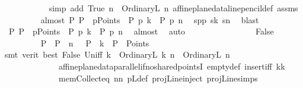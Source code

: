 \begin{isabellebody}
\ \ \ \ \ \ \ \ \ \ \isamarkupfalse%
\ {\isacharparenleft}{\kern0pt}simp\ add{\isacharcolon}{\kern0pt}\ True\ {\isacartoucheopen}n\ {\isacharequal}{\kern0pt}\ OrdinaryL\ n{}{\isacartoucheclose}\ affine{\isacharunderscore}{\kern0pt}plane{\isacharunderscore}{\kern0pt}data{\isachardot}{\kern0pt}line{\isacharunderscore}{\kern0pt}pencil{\isacharunderscore}{\kern0pt}def\ assms{\isacharparenleft}{\kern0pt}{}{\isacharparenright}{\kern0pt}{\isacharparenright}{\kern0pt}\isanewline
\ \ \ \ \ \ \ \ \isamarkupfalse%
\ almost{\isacharcolon}{\kern0pt}\ {\isachardoublequoteopen}{\isasymexists}P{\isachardot}{\kern0pt}\ P\ {\isasymin}\ pPoints\ {\isasymand}\ P\ p{\isasymlhd}\ k\ {\isasymand}\ P\ p{\isasymlhd}\ n{\isachardoublequoteclose}\ \isamarkupfalse%
\ spp\ sk\ sn\ \isamarkupfalse%
\ blast\isanewline
\ \ \ \ \ \ \ \ \isamarkupfalse%
\ \ {\isachardoublequoteopen}{\isasymexists}P{\isachardot}{\kern0pt}\ P\ {\isasymin}\ pPoints\ {\isasymand}\ P\ p{\isasymlhd}\ k\ {\isasymand}\ P\ p{\isasymlhd}\ n{\isachardoublequoteclose}\ \isamarkupfalse%
\ almost\ \isamarkupfalse%
\ auto\isanewline
\ \ \ \ \ \ \isamarkupfalse%
\isanewline
\ \ \ \ \ \ \ \ \isamarkupfalse%
\ False\ \isanewline
\ \ \ \ \ \ \ \ \isamarkupfalse%
\ P\ \ {\isachardoublequoteopen}P\ {\isasymlhd}\ n{}\ \ {\isasymand}\ P\ {\isasymlhd}\ k{}\ {\isasymand}\ P\ {\isasymin}\ Points{\isachardoublequoteclose}\ \isanewline
\ \ \ \ \ \ \ \ \ \ \isamarkupfalse%
\ {\isacharparenleft}{\kern0pt}smt\ {\isacharparenleft}{\kern0pt}verit{\isacharcomma}{\kern0pt}\ best{\isacharparenright}{\kern0pt}\ False\ Un{\isacharunderscore}{\kern0pt}iff\ {\isacartoucheopen}k\ {\isacharequal}{\kern0pt}\ OrdinaryL\ k{}{\isacartoucheclose}\ {\isacartoucheopen}n\ {\isacharequal}{\kern0pt}\ OrdinaryL\ n{}{\isacartoucheclose}\ \isanewline
\ \ \ \ \ \ \ \ \ \ \ \ \ \ affine{\isacharunderscore}{\kern0pt}plane{\isacharunderscore}{\kern0pt}data{\isachardot}{\kern0pt}parallel{\isacharunderscore}{\kern0pt}if{\isacharunderscore}{\kern0pt}no{\isacharunderscore}{\kern0pt}shared{\isacharunderscore}{\kern0pt}pointsI\ empty{\isacharunderscore}{\kern0pt}def\ insert{\isacharunderscore}{\kern0pt}iff\ kk\ \isanewline
\ \ \ \ \ \ \ \ \ \ \ \ \ \ mem{\isacharunderscore}{\kern0pt}Collect{\isacharunderscore}{\kern0pt}eq\ nn\ pLdef\ projLine{\isachardot}{\kern0pt}inject\ projLine{\isachardot}{\kern0pt}simps{\isacharparenleft}{\kern0pt}{}{\isacharparenright}{\kern0pt}{\isacharparenright}{\kern0pt}\isanewline

\end{isabellebody}
